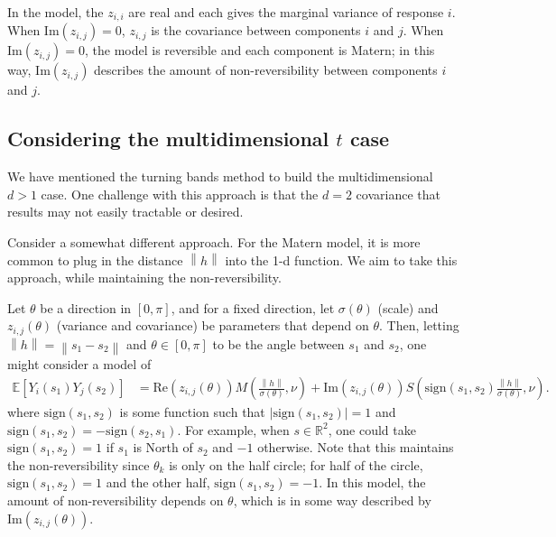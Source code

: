 \documentclass[11pt]{article}
\begin{document}
In the model, the $z_{i,i}$ are real and each gives the marginal variance of response $i$. When $\textrm{Im}(z_{i,j}) = 0$, $z_{i,j}$ is the covariance between components $i$ and $j$. When $\textrm{Im}(z_{i,j}) = 0$, the model is reversible and each component is Matern; in this way, $\textrm{Im}(z_{i,j})$ describes the amount of non-reversibility between components $i$ and $j$.

\subsection{Considering the multidimensional $t$ case}

%
%

We have mentioned the turning bands method to build the multidimensional $d > 1$ case. One challenge with this approach is that the $d=2$ covariance that results may not easily tractable or desired.

Consider a somewhat different approach. For the Matern model, it is more common to plug in the distance $\left\lVert h \right\rVert$ into the 1-d function. We aim to take this approach, while maintaining the non-reversibility.

Let $\theta$ be a direction in $[0,\pi]$, and for a fixed direction, let $\sigma(\theta)$ (scale) and $z_{i,j}(\theta)$ (variance and covariance) be parameters that depend on $\theta$. Then, letting $\left\lVert h\right\rVert = \left\lVert s_1 - s_2\right\rVert$ and $\theta\in [0,\pi]$ to be the angle between $s_1$ and $s_2$, one might consider a model of \begin{align*}
\mathbb{E}[ Y_i(s_1) Y_j(s_2) ] &= \textrm{Re}(z_{i,j}(\theta)) M\left( \frac{\left\lVert h\right\rVert }{\sigma(\theta)}, \nu\right) + \textrm{Im}(z_{i,j}(\theta))S\left( \textrm{sign}(s_1,s_2)\frac{\left\lVert h\right\rVert }{\sigma(\theta)} , \nu\right).
\end{align*}where $\textrm{sign}(s_1,s_2)$ is some function such that $|\textrm{sign}(s_1,s_2)| = 1$ and $ \textrm{sign}(s_1,s_2)= -\textrm{sign}(s_2,s_1)$. For example, when $s \in \mathbb{R}^2$, one could take $\textrm{sign}(s_1,s_2) = 1$ if $s_1$ is North of $s_2$ and $-1$ otherwise. Note that this maintains the non-reversibility since $\theta_k$ is only on the half circle; for half of the circle,  $\textrm{sign}(s_1,s_2) = 1$ and the other half, $\textrm{sign}(s_1,s_2) =-1$. In this model, the amount of non-reversibility depends on $\theta$, which is in some way described by $\textrm{Im}(z_{i,j}(\theta))$. 
\end{document}
